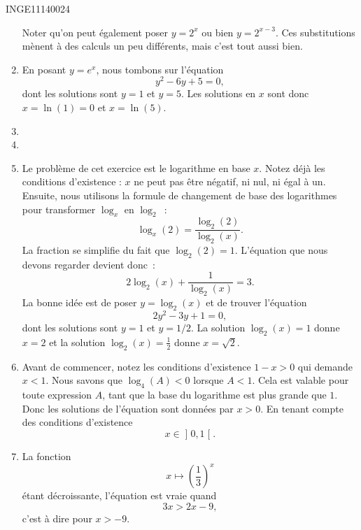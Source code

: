 \documentclass{article}
\begin{document}
\begin{corrige}{INGE11140024}
\begin{enumerate}
			Noter qu'on peut également poser $y=2^x$ ou bien $y=2^{x-3}$. Ces substitutions mènent à des calculs un peu différents, mais c'est tout aussi bien.
		\item
			En posant $y=e^x$, nous tombons sur l'équation
			\begin{equation}
				y^2-6y+5=0,
			\end{equation}
			dont les solutions sont $y=1$ et $y=5$. Les solutions en $x$ sont donc $x=\ln(1)=0$ et $x=\ln(5)$.
		\item
		\item
		\item
			Le problème de cet exercice est le logarithme en base $x$. Notez déjà les conditions d'existence : $x$ ne peut pas être négatif, ni nul, ni égal à un. Ensuite, nous utilisons la formule de changement de base des logarithmes pour transformer $\log_x$ en $\log_2$~:
			\begin{equation}
				\log_x(2)=\frac{ \log_2(2) }{ \log_2(x) }.
			\end{equation}
			La fraction se simplifie du fait que $\log_2(2)=1$. L'équation que nous devons regarder devient donc~:
			\begin{equation}
				2\log_2(x)+\frac{1}{ \log_2(x) }=3.
			\end{equation}
			La bonne idée est de poser $y=\log_2(x)$ et de trouver l'équation
			\begin{equation}
				2y^2-3y+1=0,
			\end{equation}
			dont les solutions sont $y=1$ et $y=1/2$. La solution $\log_2(x)=1$ donne $x=2$ et la solution $\log_2(x)=\frac{1}{ 2 }$ donne $x=\sqrt{2}$.
		\item
			Avant de commencer, notez les conditions d'existence $1-x>0$ qui demande $x<1$.	Nous savons que $\log_4(A)<0$ lorsque $A<1$. Cela est valable pour toute expression $A$, tant que la base du logarithme est plus grande que $1$. Donc les solutions de l'équation sont données par $x>0$. En tenant compte des conditions d'existence
			\begin{equation}
				x\in\mathopen] 0 , 1 \mathclose[.
			\end{equation}
			
		\item
			La fonction
			\begin{equation}
				x\mapsto\left( \frac{ 1 }{ 3 } \right)^x
			\end{equation}
			étant décroissante, l'équation est vraie quand 
			\begin{equation}
				3x>2x-9,
			\end{equation}
			c'est à dire pour $x>-9$.
			

	\end{enumerate}

\end{corrige}
\end{document}
